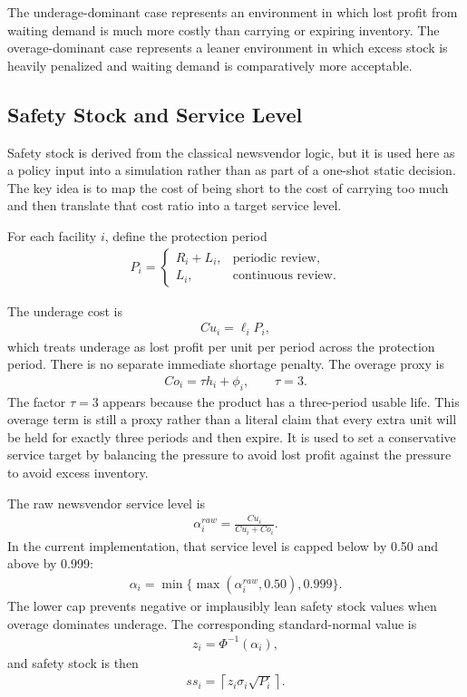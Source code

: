 \documentclass[11pt]{article}
\begin{document}
The underage-dominant case represents an environment in which lost profit from waiting demand is much more costly than carrying or expiring inventory. The overage-dominant case represents a leaner environment in which excess stock is heavily penalized and waiting demand is comparatively more acceptable.

\subsection{Safety Stock and Service Level}
Safety stock is derived from the classical newsvendor logic, but it is used here as a policy input into a simulation rather than as part of a one-shot static decision. The key idea is to map the cost of being short to the cost of carrying too much and then translate that cost ratio into a target service level.

For each facility $i$, define the protection period
\begin{align}
P_i =
\begin{cases}
R_i + L_i, & \text{periodic review},\\
L_i, & \text{continuous review}.
\end{cases}
\end{align}

The underage cost is
\begin{align}
Cu_i = \ell_i P_i,
\end{align}
which treats underage as lost profit per unit per period across the protection period. There is no separate immediate shortage penalty. The overage proxy is
\begin{align}
Co_i = \tau h_i + \phi_i, \qquad \tau=3.
\end{align}
The factor $\tau=3$ appears because the product has a three-period usable life. This overage term is still a proxy rather than a literal claim that every extra unit will be held for exactly three periods and then expire. It is used to set a conservative service target by balancing the pressure to avoid lost profit against the pressure to avoid excess inventory.

The raw newsvendor service level is
\begin{align}
\alpha_i^{raw} = \frac{Cu_i}{Cu_i + Co_i}.
\end{align}
In the current implementation, that service level is capped below by 0.50 and above by 0.999:
\begin{align}
\alpha_i = \min\{\max(\alpha_i^{raw},0.50),0.999\}.
\end{align}
The lower cap prevents negative or implausibly lean safety stock values when overage dominates underage. The corresponding standard-normal value is
\begin{align}
z_i = \Phi^{-1}(\alpha_i),
\end{align}
and safety stock is then
\begin{align}
ss_i = \left\lceil z_i \sigma_i \sqrt{P_i} \right\rceil.
\end{align}
\end{document}
